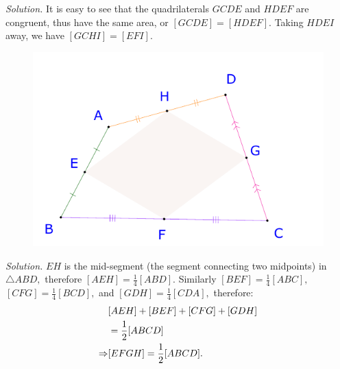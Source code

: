 \begin{multicols}{2}
\begin{figure}[H]
		\vspace*{-10pt}
	\end{figure}
	\textit{Solution.}
		It is easy to see that the quadrilaterals $GCDE$ and $HDEF$ are congruent, thus have the same area, or $[GCDE] = [HDEF].$
		Taking $HDEI$ away, we have $[GCHI] = [EFI].$ 
	\vskip 0.2cm
	\begin{figure}[H]
		\vspace*{-5pt}
		\centering
		\captionsetup{labelformat= empty, justification=centering}
		\includegraphics[width= 1\linewidth]{23-24-s3-i-p5.pdf}
		\vspace*{-10pt}
	\end{figure}
	\textit{Solution.}
		$EH$ is the mid-segment (the segment connecting two midpoints) in $\triangle ABD,$ therefore $[AEH] = \frac{1}{4}[ABD].$
		Similarly $[BEF] = \frac{1}{4}[ABC],$ $[CFG] = \frac{1}{4}[BCD],$ and $[GDH] = \frac{1}{4}[CDA],$ therefore:
		\begin{align*}
			&[AEH] + [BEF] + [CFG] + [GDH] \\
			&= \frac{1}{2} [ABCD]\\
			 \Rightarrow  &[EFGH] = \frac{1}{2} [ABCD].
		\end{align*} 
\end{multicols}
